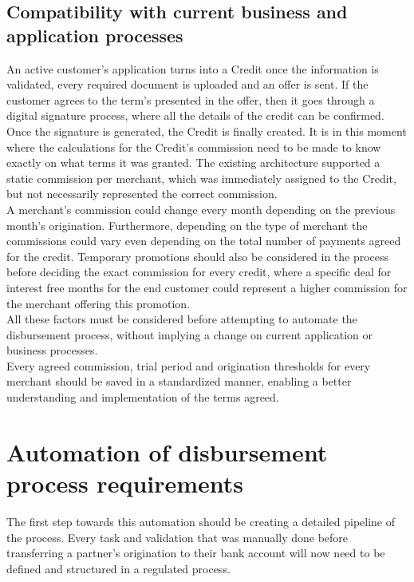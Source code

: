 \subsection{Compatibility with current business and application processes}
An active customer’s application turns into a Credit once the information is validated, every required document is uploaded and an offer is sent. If the customer agrees to the term’s presented in the offer, then it goes through a digital signature process, where all the details of the credit can be confirmed. Once the signature is generated, the Credit is finally created. It is in this moment where the calculations for the Credit’s commission need to be made to know exactly on what terms it was granted. The existing architecture supported a static commission per merchant, which was immediately assigned to the Credit, but not necessarily represented the correct commission.\\

A merchant’s commission could change every month depending on the previous month’s origination. Furthermore, depending on the type of merchant the commissions could vary even depending on the total number of payments agreed for the credit. Temporary promotions should also be considered in the process before deciding the exact commission for every credit, where a specific deal for interest free months for the end customer could represent a higher commission for the merchant offering this promotion.\\

All these factors must be considered before attempting to automate the disbursement process, without implying a change on current application or business processes.\\

Every agreed commission, trial period and origination thresholds for every merchant should be saved in a standardized manner, enabling a better understanding and implementation of the terms agreed.

\section{Automation of disbursement process requirements}
The first step towards this automation should be creating a detailed pipeline of the process. Every task and validation that was manually done before transferring a partner’s origination to their bank account will now need to be defined and structured in a regulated process.\\

